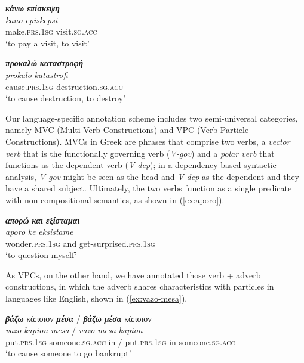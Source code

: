 \documentclass[output=paper,colorlinks,citecolor=brown]{langscibook}
\begin{document}
\ea
\label{ex:kano-episkepsi}
\settowidth {}
\glll
\textbf{\em{κάνω}} \textbf{\em{επίσκεψη}} \\
\textit{kano} \textit{episkepsi} \\
make.\textsc{prs.1sg} visit.\textsc{sg.acc} \\
\glt ‘to pay a visit, to visit’
\z

\ea
\label{ex:prokalo-katastrofi}
\settowidth {}
\glll
\textbf{\em{προκαλώ}} \textbf{\em{καταστροφή}} \\
\textit{prokalo} \textit{katastrofi} \\
cause.\textsc{prs.1sg} destruction.\textsc{sg.acc} \\
\glt ‘to cause destruction, to destroy’
\z

Our language-specific annotation scheme includes two semi-universal categories, namely MVC (Multi-Verb Constructions) and VPC (Verb-Particle Constructions). MVCs in Greek are phrases that comprise two verbs, a \textit{vector verb} that is the functionally governing verb (\textit{V-gov}) and a \textit{polar verb} that functions as the dependent verb (\textit{V-dep}); in a dependency-based syntactic analysis, \textit{V-gov} might be seen as the head and \textit{V-dep} as the dependent and they have a shared subject. Ultimately, the two verbs function as a single predicate with non-compositional semantics, as shown in (\ref{ex:aporo}). 

 \ea
 \label{ex:aporo}
 \settowidth {}
 \glll
 \textbf{\em{απορώ}} \textbf{\em{και}} \textbf{\em{εξίσταμαι}} \\
\textit{aporo} \textit{ke} \textit{eksistame} \\
wonder.\textsc{prs.1sg} and get-surprised.\textsc{prs.1sg} \\
\glt ‘to question myself’
\z

As VPCs, on the other hand, we have annotated those verb + adverb constructions, in which the adverb shares characteristics with particles in languages like English, shown in (\ref{ex:vazo-mesa}). 



\ea
 \label{ex:vazo-mesa}
 \settowidth {}
 \glll
 \textbf{\em{βάζω}} κάποιον \textbf{\em{μέσα}} /  \textbf{\em{βάζω}} \textbf{\em{μέσα}} κάποιον \\ 
 \textit{vazo} \textit{kapion} \textit{mesa} / \textit{vazo} \textit{mesa} \textit{kapion} \\
 put.\textsc{prs.1sg} someone.\textsc{sg.acc} in / put.\textsc{prs.1sg} in someone.\textsc{sg.acc} \\
 \glt ‘to cause someone to go bankrupt’ \\
 \z
\end{document}
